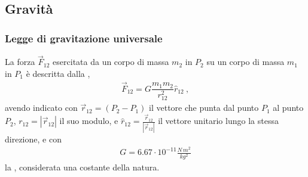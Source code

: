 \documentclass[letterpaper,10pt,italian]{jupyterBook}
\begin{document}
\subsection{Gravità}
\label{\detokenize{ch/mechanics/actions-examples:gravita}}\label{\detokenize{ch/mechanics/actions-examples:physics-hs-mechanics-actions-gravitation}}

\subsubsection{Legge di gravitazione universale}
\label{\detokenize{ch/mechanics/actions-examples:legge-di-gravitazione-universale}}\label{\detokenize{ch/mechanics/actions-examples:physics-hs-mechanics-actions-gravitation-newton}}
\sphinxAtStartPar
La forza \(\vec{F}_{12}\) esercitata da un corpo di massa \(m_2\) in \(P_2\) su un corpo di massa \(m_1\) in \(P_1\) è descritta dalla ,
\begin{equation*}
\begin{split}\vec{F}_{12} = G \dfrac{m_1 m_2}{r_{12}^2} \hat{r}_{12} \ ,\end{split}
\end{equation*}
\sphinxAtStartPar
avendo indicato con \(\vec{r}_{12} = (P_2 - P_1)\) il vettore che punta dal punto \(P_1\) al punto \(P_2\), \(r_{12} = |\vec{r}_{12}|\) il suo modulo, e \(\hat{r}_{12} = \frac{\vec{r}_{12}}{|\vec{r}_{12}|}\) il vettore unitario lungo la stessa direzione, e con
\begin{equation*}
\begin{split}G = 6.67 \cdot 10^{-11} \frac{N \, m^2}{kg^2}\end{split}
\end{equation*}
\sphinxAtStartPar
la , considerata una costante della natura. 
\end{document}
